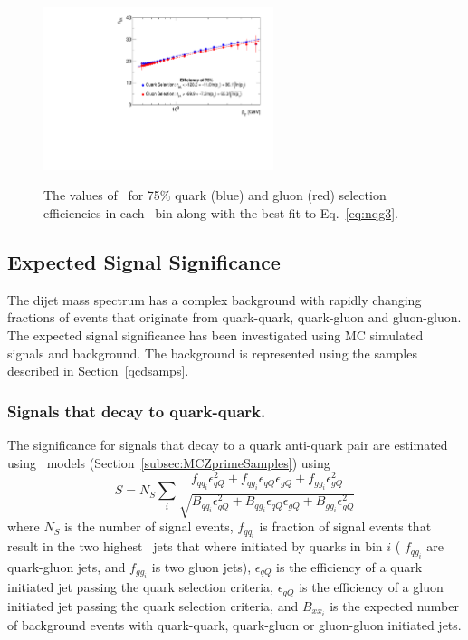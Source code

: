\begin{figure}[p]
 \centering
 {\includegraphics[width=0.60\textwidth]{figures/tagging/quark_frac_newFit_selection_errors_5}}

\caption{ The values of \ntrk\ for  75\%  quark (blue) and gluon (red) 
selection efficiencies in each \pT\ bin along with the best fit to Eq.~\ref{eq:nqg3}.
 \label{fig:qg_selection_curves}}
\end{figure}





\clearpage

\subsection{Expected Signal Significance}
\label{sec:ExpectedSig}

The dijet mass spectrum has a complex background with rapidly changing  fractions of events that originate 
from quark-quark, quark-gluon and gluon-gluon. The expected signal significance has been investigated using 
MC simulated  signals and background. The background is represented using the \QCD samples described 
in Section~\ref{qcdsamps}. 

\subsubsection{Signals that decay to quark-quark.}

The significance for signals that decay to a quark anti-quark pair are estimated using \Zprime\ models (Section~\ref{subsec:MCZprimeSamples}) using 
\begin{equation}
S = N_S \sum_i{ \dfrac{ f_{{qq}_i}\epsilon_{qQ}^2 + f_{{qg}_i}\epsilon_{qQ}\epsilon_{gQ} + f_{{gg}_i}\epsilon_{gQ}^2  } {\sqrt{ B_{{qq}_i}\epsilon_{qQ}^2 + B_{{qg}_i}\epsilon_{qQ}\epsilon_{gQ} + B_{{gg}_i}\epsilon_{gQ}^2  }}}
\end{equation}
where $N_S$ is the number of signal events, $f_{{qq}_i}$ is fraction of signal events that result in the two 
highest \pT\ jets that where initiated by quarks in bin $i$ ( $f_{{qg}_i}$ are quark-gluon jets, and $f_{{gg}_i}$ is two gluon jets), 
$\epsilon_{qQ}$ is the efficiency of a quark initiated jet passing the quark selection criteria, 
$\epsilon_{gQ}$ is the efficiency of a gluon initiated jet passing the quark selection criteria, 
and $B_{{xx}_i}$ is the expected number of background events with quark-quark, quark-gluon or gluon-gluon initiated jets. 


